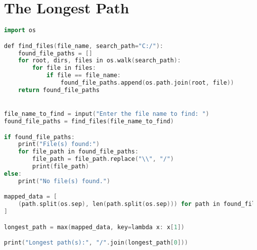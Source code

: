\documentclass{article}
\begin{document}
\section{The Longest Path}
\begin{lstlisting}[language=C++, caption=The Longest Path C++ Code, label=lst:code]
import os

def find_files(file_name, search_path="C:/"):
    found_file_paths = []
    for root, dirs, files in os.walk(search_path):
        for file in files:
            if file == file_name:
                found_file_paths.append(os.path.join(root, file))
    return found_file_paths


file_name_to_find = input("Enter the file name to find: ")
found_file_paths = find_files(file_name_to_find)

if found_file_paths:
    print("File(s) found:")
    for file_path in found_file_paths:
        file_path = file_path.replace("\\", "/")
        print(file_path)
else:
    print("No file(s) found.")

mapped_data = [
    (path.split(os.sep), len(path.split(os.sep))) for path in found_file_paths
]

longest_path = max(mapped_data, key=lambda x: x[1])

print("Longest path(s):", "/".join(longest_path[0]))
\end{lstlisting}
\end{document}
